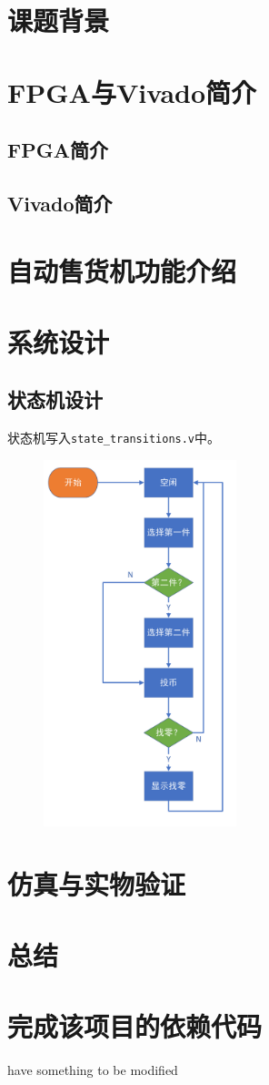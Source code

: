 \documentclass[12pt]{SEU-Circuit-Report}
\begin{document}
    \exptitlepage
    \section{课题背景}
    \section{FPGA与Vivado简介}
    \subsection{FPGA简介}
    \subsection{Vivado简介}
    \section{自动售货机功能介绍}
    \section{系统设计}
    
    \subsection{状态机设计}
    状态机写入\texttt{state_transitions.v}中。
    \begin{figure}[htbp]
        \centering
        \includegraphics[width=0.5\textwidth]{fig/flowchart.pdf}
    \end{figure}
    \section{仿真与实物验证}
    \section{总结}
    \appendix
    \section{完成该项目的依赖代码}
    have something to be modified
\end{document}
